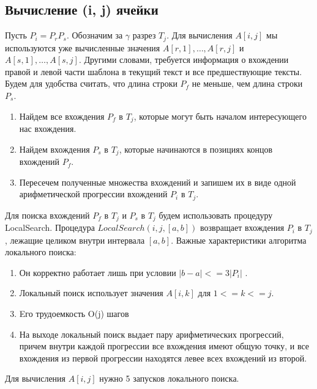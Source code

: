 \documentclass[14pt]{article}
\begin{document}
\subsection{Вычисление (i, j) ячейки}
Пусть $P_i = P_r P_s$. Обозначим за $\gamma$ разрез $T_j$. Для вычисления $A[i, j]$ мы используются уже вычисленные значения $A[r,1], \dots, A[r, j]$ и $A[s,1],\dots, A[s, j]$. Другими словами, требуется информация о вхождении правой и левой части шаблона в текущий текст и все предшествующие тексты. Будем для удобства считать, что длина строки $P_f$ не меньше, чем длина строки $P_s$. 
\begin{enumerate}
\item Найдем все вхождения $P_f$ в $T_j$, которые могут быть началом интересующего нас вхождения.
\item Найдем вхождения $P_s$ в $T_j$, которые начинаются в позициях концов вхождений $P_f$.
\item Пересечем полученные множества вхождений и запишем их в виде одной арифметической прогрессии вхождений $P_i$ в $T_j$.
\end{enumerate}
Для поиска вхождений $P_f$ в $T_j$ и $P_s$ в $T_j$ будем использовать процедуру LocalSearch. Процедура $LocalSearch(i, j, [a, b])$ возвращает вхождения $P_i$ в $T_j$ , лежащие целиком внутри интервала $[a, b]$. Важные характеристики алгоритма локального поиска:
\begin{enumerate}
\item Он корректно работает лишь при условии  $ |b - a| <= 3 |P_i|$ .
\item Локальный поиск использует значения $A[i, k]$ для $1 <= k <= j$.
\item Eго трудоемкость O(j) шагов
\item На выходе локальный поиск выдает пару арифметических прогрессий, причем внутри каждой прогрессии все вхождения имеют общую точку, и все вхождения из первой прогрессии находятся левее всех вхождений из второй.
\end{enumerate}
Для вычисления $A[i, j]$  нужно 5 запусков локального поиска.
\end{document}
